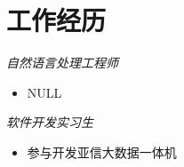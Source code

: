 \section{工作经历}
\textit{自然语言处理工程师}
\begin{itemize}
  \item NULL
\end{itemize}

\textit{软件开发实习生}
\begin{itemize}
  \item 参与开发亚信大数据一体机
\end{itemize}

